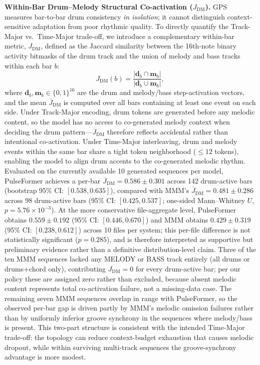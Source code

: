 \documentclass[pdflatex,sn-mathphys-num,twocolumn]{sn-jnl}
\theoremstyle{thmstyleone}
\theoremstyle{thmstyletwo}
\begin{document}
\textbf{Within-Bar Drum--Melody Structural Co-activation ($J_{\mathrm{DM}}$).}
GPS measures bar-to-bar drum consistency \emph{in isolation}; it cannot distinguish context-sensitive adaptation from poor rhythmic quality.
To directly quantify the Track-Major vs.\ Time-Major trade-off, we introduce a complementary within-bar metric, $J_{\mathrm{DM}}$, defined as the Jaccard similarity between the 16th-note binary activity bitmasks of the drum track and the union of melody and bass tracks within each bar $b$:
\begin{equation}\label{eq:jdm}
  J_{\mathrm{DM}}(b)
  = \frac{|\mathbf{d}_b \cap \mathbf{m}_b|}{|\mathbf{d}_b \cup \mathbf{m}_b|},
\end{equation}
where $\mathbf{d}_b, \mathbf{m}_b \in \{0,1\}^{16}$ are the drum and melody/bass step-activation vectors, and the mean $\overline{J}_{\mathrm{DM}}$ is computed over all bars containing at least one event on each side.
Under Track-Major encoding, drum tokens are generated before any melodic content, so the model has no access to co-generated melody context when deciding the drum pattern---$\overline{J}_{\mathrm{DM}}$ therefore reflects accidental rather than intentional co-activation.
Under Time-Major interleaving, drum and melody events within the same bar share a tight token neighborhood ($\leq\!12$ tokens), enabling the model to align drum accents to the co-generated melodic rhythm.
Evaluated on the currently available 10 generated sequences per model, PulseFormer achieves a per-bar $\overline{J}_{\mathrm{DM}} = 0.586\!\pm\!0.301$ across 142 drum-active bars (bootstrap 95\% CI: $[0.538,0.635]$), compared with MMM's $\overline{J}_{\mathrm{DM}} = 0.481\!\pm\!0.286$ across 98 drum-active bars (95\% CI: $[0.425,0.537]$; one-sided Mann--Whitney $U$, $p=5.76\times10^{-3}$).
At the more conservative file-aggregate level, PulseFormer obtains $0.559\!\pm\!0.192$ (95\% CI: $[0.446,0.670]$) and MMM obtains $0.429\!\pm\!0.319$ (95\% CI: $[0.238,0.612]$) across 10 files per system; this per-file difference is not statistically significant ($p=0.285$), and is therefore interpreted as supportive but preliminary evidence rather than a definitive distribution-level claim.
Three of the ten MMM sequences lacked any MELODY or BASS track entirely (all drums or drums+chord only), contributing $J_{\mathrm{DM}}=0$ for every drum-active bar; per our policy these are assigned zero rather than excluded, because absent melodic content represents total co-activation failure, not a missing-data case.
The remaining seven MMM sequences overlap in range with PulseFormer, so the observed per-bar gap is driven partly by MMM's melodic omission failures rather than by uniformly inferior groove synchrony in the sequences where melody/bass is present.
This two-part structure is consistent with the intended Time-Major trade-off: the topology can reduce context-budget exhaustion that causes melodic dropout, while within surviving multi-track sequences the groove-synchrony advantage is more modest.
\end{document}
